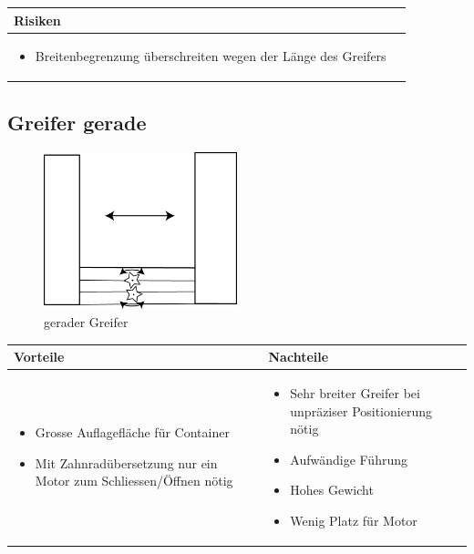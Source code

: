 \begin{table}[h]
\begin{tabular}{p{}p{}}


 \textbf{Risiken} & \\ \hline
	 
\begin{itemize}
\item Breitenbegrenzung überschreiten wegen der Länge des Greifers
\end{itemize}

 
\end{tabular}
\end{table}

\pagebreak


\subsection{Greifer gerade}
\begin{figure} [hbp]
	\centering
	\includegraphics[width=0.5\textwidth]{fig/Greifer_gerade.png}
	\caption{gerader Greifer}
\end{figure}

\begin{table}[h]
\begin{tabular}{p{} | p{}}


 \textbf{Vorteile} & \textbf{Nachteile} \\ \hline
	 
\begin{itemize}
\item Grosse Auflagefläche für Container
\item Mit Zahnradübersetzung nur ein Motor zum Schliessen/Öffnen nötig
\end{itemize}

 
 &
 
\begin{itemize}
\item Sehr breiter Greifer bei unpräziser Positionierung nötig
\item Aufwändige Führung
\item Hohes Gewicht
\item Wenig Platz für Motor
\end{itemize}

\end{tabular}
\end{table}

